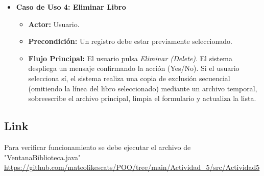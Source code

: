 \documentclass[a4paper]{article} %
\begin{document}
\begin{itemize}
    \item \textbf{Caso de Uso 4: Eliminar Libro}
    \begin{itemize}
        \item \textbf{Actor:} Usuario.
        \item \textbf{Precondición:} Un registro debe estar previamente seleccionado.
        \item \textbf{Flujo Principal:} El usuario pulsa \textit{Eliminar (Delete)}. El sistema despliega un mensaje confirmando la acción (Yes/No). Si el usuario selecciona sí, el sistema realiza una copia de exclusión secuencial (omitiendo la línea del libro seleccionado) mediante un archivo temporal, sobreescribe el archivo principal, limpia el formulario y actualiza la lista.
    \end{itemize}
\end{itemize}

\subsection{Link}
Para verificar funcionamiento se debe ejecutar el archivo de "VentanaBiblioteca.java"\\
\url{https://github.com/mateolikescats/POO/tree/main/Actividad_5/src/Actividad5}
\end{document}
